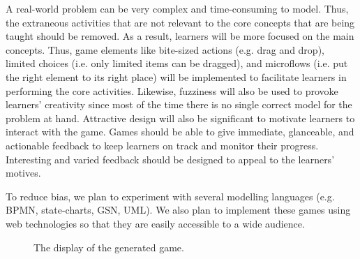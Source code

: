 \documentclass[a4paper]{Report}
\begin{document}
A real-world problem can be very complex and time-consuming to model. Thus, the extraneous activities that are not relevant to the core concepts that are being taught should be removed. As a result, learners will be more focused on the main concepts. Thus, game elements like bite-sized actions (e.g. drag and drop), limited choices (i.e. only limited items can be dragged), and microflows (i.e. put the right element to its right place) will be implemented to facilitate learners in performing the core activities. Likewise, fuzziness will also be used to provoke learners' creativity since most of the time there is no single correct model for the problem at hand. Attractive design will also be significant to motivate learners to interact with the game. Games should be able to give immediate, glanceable, and actionable feedback to keep learners on track and monitor their progress. Interesting and varied feedback should be designed to appeal to the learners' motives. 

To reduce bias, we plan to experiment with several modelling languages (e.g. BPMN, state-charts, GSN, UML). We also plan to implement these games using web technologies so that they are easily accessible to a wide audience.

\begin{figure}[h]
\centering
{}
\caption{The display of the generated game.}
\label{fig:001}
\end{figure}
\end{document}
